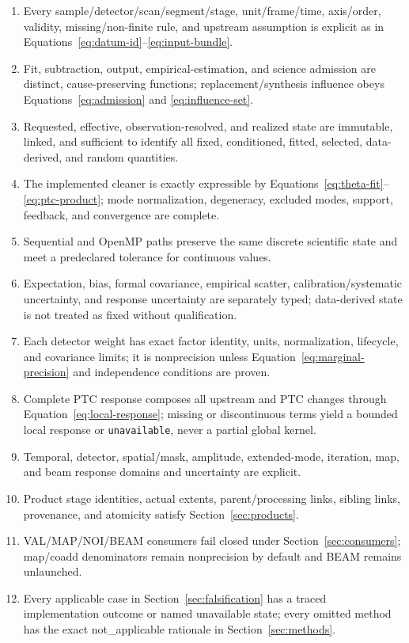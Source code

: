 \documentclass[11pt]{article}
\newcommand{\NA}{{\scriptsize\ttfamily not\_applicable}}
\newcommand{\unknown}{\texttt{unavailable}}
\begin{document}
\begin{enumerate}[label=\texttt{PTC-C\arabic*},leftmargin=*]
  \item Every sample/detector/scan/segment/stage, unit/frame/time, axis/order,
  validity, missing/non-finite rule, and upstream assumption is explicit as in
  Equations~\eqref{eq:datum-id}--\eqref{eq:input-bundle}.
  \item Fit, subtraction, output, empirical-estimation, and science admission
  are distinct, cause-preserving functions; replacement/synthesis influence
  obeys Equations~\eqref{eq:admission} and \eqref{eq:influence-set}.
  \item Requested, effective, observation-resolved, and realized state are
  immutable, linked, and sufficient to identify all fixed, conditioned,
  fitted, selected, data-derived, and random quantities.
  \item The implemented cleaner is exactly expressible by
  Equations~\eqref{eq:theta-fit}--\eqref{eq:ptc-product}; mode normalization,
  degeneracy, excluded modes, support, feedback, and convergence are complete.
  \item Sequential and OpenMP paths preserve the same discrete scientific
  state and meet a predeclared tolerance for continuous values.
  \item Expectation, bias, formal covariance, empirical scatter,
  calibration/systematic uncertainty, and response uncertainty are separately
  typed; data-derived state is not treated as fixed without qualification.
  \item Each detector weight has exact factor identity, units, normalization,
  lifecycle, and covariance limits; it is nonprecision unless
  Equation~\eqref{eq:marginal-precision} and independence conditions are proven.
  \item Complete PTC response composes all upstream and PTC changes through
  Equation~\eqref{eq:local-response}; missing or discontinuous terms yield a
  bounded local response or \unknown, never a partial global kernel.
  \item Temporal, detector, spatial/mask, amplitude, extended-mode,
  iteration, map, and beam response domains and uncertainty are explicit.
  \item Product stage identities, actual extents, parent/processing links,
  sibling links, provenance, and atomicity satisfy Section~\ref{sec:products}.
  \item VAL/MAP/NOI/BEAM consumers fail closed under
  Section~\ref{sec:consumers}; map/coadd denominators remain nonprecision by
  default and BEAM remains unlaunched.
  \item Every applicable case in Section~\ref{sec:falsification} has a traced
  implementation outcome or named unavailable state; every omitted method has
  the exact \NA{} rationale in Section~\ref{sec:methods}.
\end{enumerate}
\end{document}

